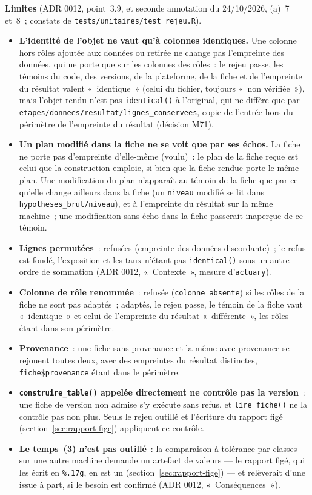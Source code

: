 \documentclass[a4paper,11pt]{article}
\newcommand{\code}[1]{\texttt{\small #1}}
\begin{document}
\noindent
\textbf{Limites} (ADR 0012, point~3.9, et seconde annotation du
24/10/2026, (a)~7 et~8~; constats de \code{tests/unitaires/test\_rejeu.R}).
\begin{itemize}[leftmargin=*, itemsep=2pt]
  \item \textbf{L'identité de l'objet ne vaut qu'à colonnes identiques.} Une
    colonne hors rôles ajoutée aux données ou retirée ne change pas
    l'empreinte des données, qui ne porte que sur les colonnes des rôles~:
    le rejeu passe, les témoins du code, des versions, de la plateforme, de
    la fiche et de l'empreinte du résultat valent «~identique~» (celui du
    fichier, toujours «~non vérifiée~»), mais l'objet
    rendu n'est pas \code{identical()} à l'original, qui ne diffère que par
    \code{etapes/donnees/resultat/lignes\_conservees}, copie de l'entrée
    hors du périmètre de l'empreinte du résultat (décision M71).
  \item \textbf{Un plan modifié dans la fiche ne se voit que par ses échos.}
    La fiche ne porte pas d'empreinte d'elle-même (voulu)~: le plan de la
    fiche reçue est celui que la construction emploie, si bien que la fiche
    rendue porte le même plan. Une modification du plan n'apparaît au
    témoin de la fiche que par ce qu'elle change ailleurs dans la fiche (un
    \code{niveau} modifié se lit dans \code{hypotheses\_brut/niveau}), et à
    l'empreinte du résultat sur la même machine~; une modification sans
    écho dans la fiche passerait inaperçue de ce témoin.
  \item \textbf{Lignes permutées}~: refusées (empreinte des données
    discordante)~; le refus est fondé, l'exposition et les taux n'étant pas
    \code{identical()} sous un autre ordre de sommation (ADR 0012,
    «~Contexte~», mesure d'\code{actuary}).
  \item \textbf{Colonne de rôle renommée}~: refusée (\code{colonne\_absente})
    si les rôles de la fiche ne sont pas adaptés~; adaptés, le rejeu passe,
    le témoin de la fiche vaut «~identique~» et celui de l'empreinte du
    résultat «~différente~», les rôles étant dans son périmètre.
  \item \textbf{Provenance}~: une fiche sans provenance et la même avec
    provenance se rejouent toutes deux, avec des empreintes du résultat
    distinctes, \code{fiche\$provenance} étant dans le périmètre.
  \item \textbf{\code{construire\_table()} appelée directement ne contrôle
    pas la version}~: une fiche de version non admise s'y exécute sans refus,
    et \code{lire\_fiche()} ne la contrôle pas non plus. Seuls le rejeu
    outillé et l'écriture du rapport figé (section~\ref{sec:rapport-fige})
    appliquent ce contrôle.
  \item \textbf{Le temps~(3) n'est pas outillé}~: la comparaison à
    tolérance par classes sur une autre machine demande un artefact de
    valeurs --- le rapport figé, qui les écrit en \code{\%.17g}, en est un
    (section~\ref{sec:rapport-fige}) --- et relèverait d'une issue à part,
    si le besoin est confirmé (ADR 0012, «~Conséquences~»).
\end{itemize}
\end{document}
